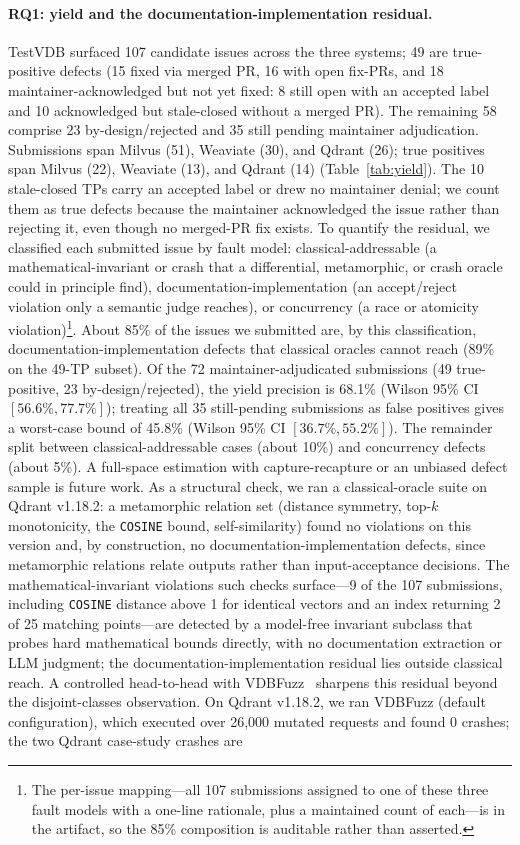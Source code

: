 \documentclass[sigconf]{acmart}
\begin{document}
\paragraph{RQ1: yield and the documentation-implementation residual.}
TestVDB surfaced 107 candidate issues across the three systems; 49 are true-positive defects (15 fixed via merged PR, 16 with open fix-PRs, and 18 maintainer-acknowledged but not yet fixed: 8 still open with an accepted label and 10 acknowledged but stale-closed without a merged PR). The remaining 58 comprise 23 by-design/rejected and 35 still pending maintainer adjudication. Submissions span Milvus (51), Weaviate (30), and Qdrant (26); true positives span Milvus (22), Weaviate (13), and Qdrant (14) (Table~\ref{tab:yield}). The 10 stale-closed TPs carry an accepted label or drew no maintainer denial; we count them as true defects because the maintainer acknowledged the issue rather than rejecting it, even though no merged-PR fix exists. To quantify the residual, we classified each submitted issue by fault model: classical-addressable (a mathematical-invariant or crash that a differential, metamorphic, or crash oracle could in principle find), documentation-implementation (an accept/reject violation only a semantic judge reaches), or concurrency (a race or atomicity violation)\footnote{The per-issue mapping---all 107 submissions assigned to one of these three fault models with a one-line rationale, plus a maintained count of each---is in the artifact, so the 85\% composition is auditable rather than asserted.}. About 85\% of the issues we submitted are, by this classification, documentation-implementation defects that classical oracles cannot reach (89\% on the 49-TP subset). Of the 72 maintainer-adjudicated submissions (49 true-positive, 23 by-design/rejected), the yield precision is 68.1\% (Wilson 95\% CI $[56.6\%, 77.7\%]$); treating all 35 still-pending submissions as false positives gives a worst-case bound of 45.8\% (Wilson 95\% CI $[36.7\%, 55.2\%]$). The remainder split between classical-addressable cases (about 10\%) and concurrency defects (about 5\%). A full-space estimation with capture-recapture or an unbiased defect sample is future work. As a structural check, we ran a classical-oracle suite on Qdrant v1.18.2: a metamorphic relation set (distance symmetry, top-$k$ monotonicity, the \texttt{COSINE} bound, self-similarity) found no violations on this version and, by construction, no documentation-implementation defects, since metamorphic relations relate outputs rather than input-acceptance decisions. The mathematical-invariant violations such checks surface---9 of the 107 submissions, including \texttt{COSINE} distance above 1 for identical vectors and an index returning 2 of 25 matching points---are detected by a model-free invariant subclass that probes hard mathematical bounds directly, with no documentation extraction or LLM judgment; the documentation-implementation residual lies outside classical reach. A controlled head-to-head with VDBFuzz~\cite{vdbfuzz26} sharpens this residual beyond the disjoint-classes observation. On Qdrant v1.18.2, we ran VDBFuzz (default configuration), which executed over 26{,}000 mutated requests and found 0 crashes; the two Qdrant case-study crashes are 
\end{document}
